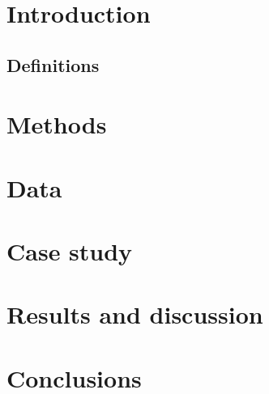 \documentclass[a4paper,11pt,twoside,openany]{book}
\begin{document}
\section{Introduction}




\subsection{Definitions}




\section{Methods}



\section{Data}



\section{Case study}



\section{Results and discussion}



\section{Conclusions}
\end{document}
